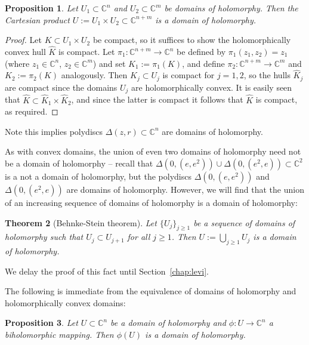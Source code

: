 \documentclass[11pt,a4paper, final, twoside]{article}
\newtheorem{theorem}{Theorem}
\newtheorem{proposition}[theorem]{Proposition}
\numberwithin{equation}{section}
\newcommand{\C}{\mathbb C}
\newcommand{\pdisc}{\Delta}
\begin{document}
\begin{proposition}
\label{prodhol}
Let $U_1\subset\C^n$ and $U_2\subset\C^m$ be domains of holomorphy. Then the Cartesian product $U:=U_1\times U_2\subset\C^{n+m}$ is a domain of holomorphy.
\end{proposition}
\begin{proof}
Let $K\subset U_1\times U_2$ be compact, so it suffices to show the holomorphically convex hull $\hat K$ is compact. Let $\pi_1\colon\C^{n+m}\to\C^n$ be defined
by $\pi_1(z_1,z_2)=z_1$ (where $z_1\in\C^n$, $z_2\in\C^m$) and set $K_1:=\pi_1(K)$, and define $\pi_2\colon\C^{n+m}\to\C^m$ and $K_2:=\pi_2(K)$ analogously. Then $K_j\subset U_j$
is compact for $j=1,2$, so the hulls $\hat K_j$ are compact since the domains $U_j$ are holomorphically convex. It is easily seen that $\hat K\subset \hat K_1\times\hat K_2$, and since
the latter is compact it follows that $\hat K$ is compact, as required.
\end{proof}
Note this implies polydiscs $\pdisc(z,r)\subset\C^n$ are domains of holomorphy.

As with convex domains, the union of even two domains of holomorphy need not be a domain of holomorphy -- recall that $\pdisc(0,(e,e^2))\cup \pdisc(0,(e^2,e))\subset\C^2$
is a not a domain of holomorphy, but the polydiscs $\pdisc(0,(e,e^2))$ and $\pdisc(0,(e^2,e))$ are domains of holomorphy.
However, we will find that the union of an increasing sequence of domains of holomorphy is a domain of holomorphy:
\begin{theorem}[Behnke-Stein theorem]
\label{behnke}
Let $\{U_j\}_{j\geq 1}$ be a sequence of domains of holomorphy such that $U_j\subset U_{j+1}$ for all $j\geq 1$. Then $U:=\bigcup_{j\geq 1} U_j$ is a domain of holomorphy.
\end{theorem}
We delay the proof of this fact until Section~\ref{chap:levi}. 

The following is immediate from the equivalence of domains of holomorphy and holomorphically convex domains:
\begin{proposition}
\label{holinvbi}
Let $U\subset\C^n$ be a domain of holomorphy and $\phi\colon U\to\C^n$ a biholomorphic mapping. Then $\phi(U)$ is a domain of holomorphy. 
\end{proposition}
\end{document}
